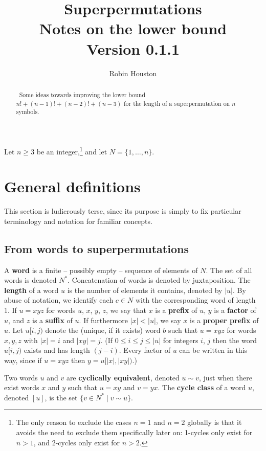 \documentclass[a4paper]{article}
\author{Robin Houston}
\title{Superpermutations\\[0.4em]\large Notes on the lower bound\\[0.4em]\normalsize Version 0.1.1}
\theoremstyle{definition}
\theoremstyle{remark}
\let\definiendum\textbf
\begin{document}
\maketitle

\begin{abstract}\noindent\
    Some ideas towards improving the lower bound
    $
        n! + (n-1)! + (n-2)! + (n-3)
    $
    for the length of a superpermutation on $n$ symbols.
\end{abstract}

Let $n \ge 3$ be an integer,\footnote{
    The only reason to exclude the cases $n=1$ and $n=2$ globally is that it avoids the need to exclude them specifically later on: 1-cycles only exist for $n>1$, and 2-cycles only exist for $n>2$.
} and let $N = \{1, \dots, n\}$.

\section{General definitions}
%
This section is ludicrously terse, since its purpose is simply to fix particular terminology and notation for familiar concepts.

\subsection{From words to superpermutations}
A \definiendum{word} is a finite -- possibly empty -- sequence of elements of $N$. The set of all words is denoted $N^*$. Concatenation of words is denoted by juxtaposition. The \definiendum{length} of a word $u$ is the number of elements it contains, denoted by $|u|$. By abuse of notation, we identify each $c\in N$ with the corresponding word of length 1. If $u=xyz$ for words $u$, $x$, $y$, $z$, we say that $x$ is a \definiendum{prefix} of $u$, $y$ is a \definiendum{factor} of $u$, and $z$ is a \definiendum{suffix} of $u$. If furthermore $|x|<|u|$, we say $x$ is a \definiendum{proper prefix} of $u$. Let $u[i,j)$ denote the (unique, if it exists) word $b$ such that $u=xyz$ for words $x, y, z$ with $|x|=i$ and $|xy|=j$. (If $0\le i\le j\le|u|$ for integers $i$, $j$ then the word $u[i,j)$ exists and has length $(j-i)$. Every factor of $u$ can be written in this way, since if $u=xyz$ then $y=u[|x|, |xy|)$.)

Two words $u$ and $v$ are \definiendum{cyclically equivalent}, denoted $u\sim v$, just when there exist words $x$ and $y$ such that $u=xy$ and $v=yx$. The \definiendum{cycle class} of a word $u$, denoted $[u]$, is the set $\{v\in N^*\;|\;v\sim u\}$.
\end{document}
